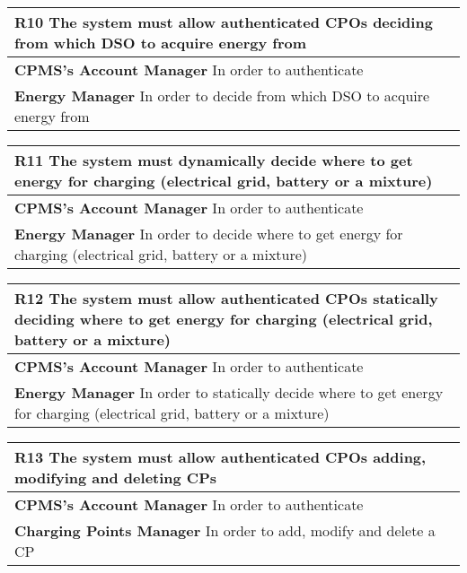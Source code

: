 \begin{table}[H]
    \begin{tabularx}{\textwidth}{X}
        \toprule
        \textbf{R10} The system must allow authenticated CPOs deciding from which DSO to
        acquire energy from        \\ \midrule
        \textbf{CPMS's Account Manager} In order to authenticate  \\                                                                                      
        \textbf{Energy Manager} In order to decide from which DSO to
        acquire energy from \\ 
    \end{tabularx}
\end{table}
\begin{table}[H]
    \begin{tabularx}{\textwidth}{X}
        \toprule
        \textbf{R11} The system must dynamically decide where to get energy for charging (electrical
        grid, battery or a mixture)        \\ \midrule
        \textbf{CPMS's Account Manager} In order to authenticate  \\                                                                                      
        \textbf{Energy Manager} In order to decide where to get energy for charging (electrical
        grid, battery or a mixture) \\ 
    \end{tabularx}
\end{table}
\begin{table}[H]
    \begin{tabularx}{\textwidth}{X}
        \toprule
        \textbf{R12} The system must allow authenticated CPOs statically deciding where to get
        energy for charging (electrical grid, battery or a mixture)        \\ \midrule
        \textbf{CPMS's Account Manager} In order to authenticate \\                                                                                      
        \textbf{Energy Manager} In order to statically decide where to get
        energy for charging (electrical grid, battery or a mixture) \\ 
    \end{tabularx}
\end{table}
\begin{table}[H]
    \begin{tabularx}{\textwidth}{X}
        \toprule
        \textbf{R13} The system must allow authenticated CPOs adding, modifying and deleting CPs                \\ \midrule
        \textbf{CPMS's Account Manager}  In order to authenticate                                                                                     \\
        \textbf{Charging Points Manager}  In order to add, modify and delete a CP\\
    \end{tabularx}
\end{table}

